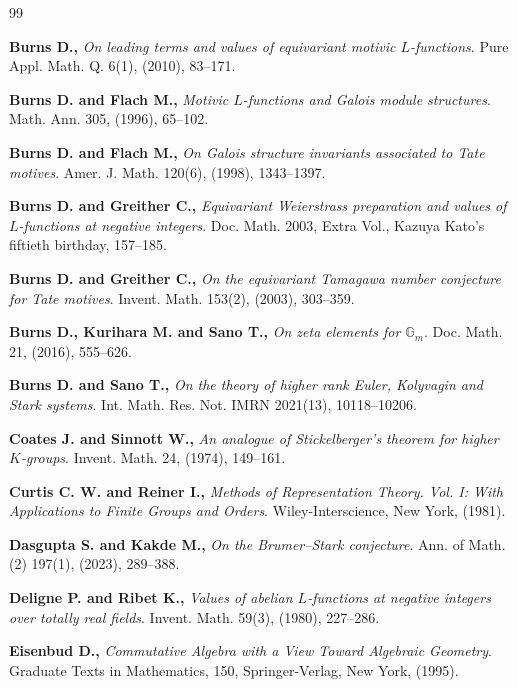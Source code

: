 \documentclass[a4paper,11pt]{article}
\begin{document}
\begin{thebibliography}{99}

{\bf Burns D.,}
\textit{On leading terms and values of equivariant motivic \(L\)-functions}.
Pure Appl. Math. Q. 6(1), (2010), 83--171.

{\bf Burns D. and Flach M.,}
\textit{Motivic \(L\)-functions and Galois module structures}.
Math. Ann. 305, (1996), 65--102.

{\bf Burns D. and Flach M.,}
\textit{On Galois structure invariants associated to Tate motives}.
Amer. J. Math. 120(6), (1998), 1343--1397.

{\bf Burns D. and Greither C.,}
\textit{Equivariant Weierstrass preparation and values of \(L\)-functions
at negative integers}.
Doc. Math. 2003, Extra Vol., Kazuya Kato's fiftieth birthday, 157--185.

{\bf Burns D. and Greither C.,}
\textit{On the equivariant Tamagawa number conjecture for Tate motives}.
Invent. Math. 153(2), (2003), 303--359.

{\bf Burns D., Kurihara M. and Sano T.,}
\textit{On zeta elements for \(\mathbb G_m\)}.
Doc. Math. 21, (2016), 555--626.

{\bf Burns D. and Sano T.,}
\textit{On the theory of higher rank Euler, Kolyvagin and Stark systems}.
Int. Math. Res. Not. IMRN 2021(13), 10118--10206.

{\bf Coates J. and Sinnott W.,}
\textit{An analogue of Stickelberger's theorem for higher \(K\)-groups}.
Invent. Math. 24, (1974), 149--161.

{\bf Curtis C. W. and Reiner I.,}
\textit{Methods of Representation Theory. Vol. I: With Applications to Finite
Groups and Orders}.
Wiley-Interscience, New York, (1981).

{\bf Dasgupta S. and Kakde M.,}
\textit{On the Brumer--Stark conjecture}.
Ann. of Math. (2) 197(1), (2023), 289--388.

{\bf Deligne P. and Ribet K.,}
\textit{Values of abelian \(L\)-functions at negative integers over totally
real fields}.
Invent. Math. 59(3), (1980), 227--286.

{\bf Eisenbud D.,}
\textit{Commutative Algebra with a View Toward Algebraic Geometry}.
Graduate Texts in Mathematics, 150, Springer-Verlag, New York, (1995).


\end{thebibliography}
\end{document}
